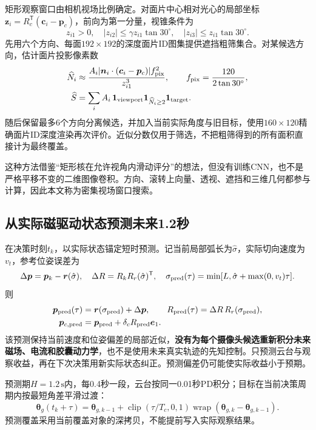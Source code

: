 \documentclass[UTF8,a4paper,zihao=5,fontset=windows]{ctexart}
\newcommand{\vect}[1]{\bm{#1}}
\newcommand{\clip}{\operatorname{clip}}
\newcommand{\wrap}{\operatorname{wrap}}
\newcommand{\unit}[1]{\,\mathrm{#1}}
\begin{document}
矩形观察窗口由相机视场比例确定。对面片中心相对光心的局部坐标$\vect z_i=R_c^{\mathsf T}(\vect c_i-\vect p_c)$，前向为第一分量，视锥条件为
\begin{equation}
z_{i1}>0,\quad |z_{i2}|\le\gamma z_{i1}\tan30^\circ,\quad |z_{i3}|\le z_{i1}\tan30^\circ.
\label{eq:viewport}
\end{equation}
先用六个方向、每面$192\times192$的深度面片ID图集提供遮挡粗筛集合。对某候选方向，估计面片投影像素数
\begin{align}
\widehat N_i&\approx\frac{A_i|\vect n_i\cdot(\vect c_i-\vect p_c)|f_{\rm pix}^2}{z_{i1}^3},
\qquad f_{\rm pix}=\frac{120}{2\tan30^\circ},\\
\widehat S&=\sum_iA_i\,\mathbf1_{\rm viewport}\mathbf1_{\widehat N_i\ge2}\mathbf1_{\rm target}.
\label{eq:approx_score}
\end{align}
随后保留最多6个方向分离候选，并加入当前实际角度与旧目标，使用$160\times120$精确面片ID深度渲染再次评价。近似分数仅用于筛选，不把粗筛得到的所有面积直接计为最终覆盖。

这种方法借鉴“矩形核在允许视角内滑动评分”的想法，但没有训练CNN，也不是严格平移不变的二维图像卷积。方向、滚转上向量、透视、遮挡和三维几何都参与计算，因此本文称为密集视场窗口搜索。

\subsection{从实际磁驱动状态预测未来1.2秒}
在决策时刻$t_k$，以实际状态锚定短时预测。记当前局部弧长为$\hat\sigma$，实际切向速度为$v_t$，参考位姿误差为
\begin{equation}
\Delta\vect p=\vect p_k-\vect r(\hat\sigma),\quad
\Delta R=R_kR_r(\hat\sigma)^{\mathsf T},\quad
\sigma_{\rm pred}(\tau)=\min[L,\hat\sigma+\max(0,v_t)\tau].
\end{equation}
则
\begin{align}
\vect p_{\rm pred}(\tau)&=\vect r(\sigma_{\rm pred})+\Delta\vect p,\qquad
R_{\rm pred}(\tau)=\Delta R\,R_r(\sigma_{\rm pred}),\\
\vect p_{c,\rm pred}&=\vect p_{\rm pred}+\delta_cR_{\rm pred}\vect e_1.
\label{eq:pose_prediction}
\end{align}
该预测保持当前速度和位姿偏差的局部近似，\textbf{没有为每个摄像头候选重新积分未来磁场、电流和胶囊动力学}，也不是使用未来真实轨迹的先知控制。只预测云台与观察收益，再在下次决策用新实际状态纠正。预测偏差仍可能使实际收益小于预期。

预测期$H=1.2\unit s$内，每0.4秒一段，云台按同一0.01秒PD积分；目标在当前决策周期内按最短角差平滑过渡：
\begin{equation}
\vect\theta_g(t_k+\tau)=\vect\theta_{g,k-1}+\clip(\tau/T_c,0,1)\wrap(\vect\theta_{g,k}-\vect\theta_{g,k-1}).
\label{eq:goal_blend}
\end{equation}
预测覆盖采用当前覆盖对象的深拷贝，不能提前写入实际观察结果。
\end{document}
